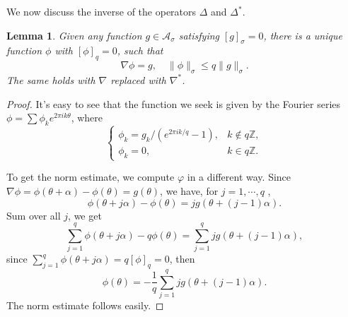 \documentclass[12pt,reqno]{amsart}
\newtheorem{lem}[thm]{Lemma}
\theoremstyle{remark}
\begin{document}
We now discuss the inverse of the operators $\Delta$ and $\Delta^*$. 
\begin{lem}
	Given any function $g \in {\mathcal{A}}_\sigma$ satisfying $[g]_\sigma = 0$, there is a unique function $\phi$ with $[\phi]_q =0$,  such that 
	\[
		\nabla \phi = g, \quad \|\phi\|_\sigma \le q \|g\|_\sigma. 
	\]
	The same holds with $\nabla$ replaced with $\nabla^*$. 
\end{lem}
\begin{proof}
	It's easy to see that the function we seek is given by the Fourier series $\phi = \sum \phi_k e^{2\pi i k \theta}$, where
	\[
		\begin{cases}
			\phi_k = g_k/(e^{2 \pi i k/q} - 1), & k \notin q {\mathbb{Z}}, \\
			\phi_k = 0, & k \in q {\mathbb{Z}}. 
		\end{cases}
	\]

	To get the norm estimate, we compute  $\varphi$ in a different way. 
	Since $\nabla \phi = \phi(\theta + \alpha) - \phi(\theta) = g(\theta)$, we have, for $j = 1, \cdots, q$ , 
	\[
		\phi(\theta + j \alpha) - \phi(\theta) = j g(\theta + (j-1) \alpha). 
	\]
	Sum over all $j$, we get 
	\[
		\sum_{j = 1}^q \phi(\theta + j \alpha) - q \phi(\theta) = \sum_{j = 1}^q j g(\theta + (j-1)\alpha), 
	\]
	since $\sum_{j = 1}^q \phi(\theta + j \alpha) = q[\phi]_q = 0$, then 
	\[
		\phi(\theta) = - \frac{1}{q} \sum_{j = 1}^q j g(\theta + (j-1)\alpha). 
	\]
	The norm estimate follows easily. 
\end{proof}
\end{document}
